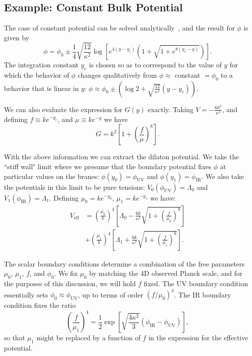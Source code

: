 \documentclass[12pt]{article}
\begin{document}
\subsection{Example:  Constant Bulk Potential}
The case of constant potential can be solved analytically~\cite{Csaki:2000wz}, and the result for $\phi$ is given by
\begin{equation}
\phi = \phi_0 \pm \frac{1}{4}\sqrt{\frac{12}{\kappa^2}} \log \left[ e^{4 (y - y_c)} \left( 1+ \sqrt{ 1 + e^{8 (y_c - y)} } \right) \right].
\end{equation}
The integration constant $y_c$ is chosen so as to correspond to the value of $y$ for which the behavior of $\phi$ changes qualitatively from $\phi \approx $ constant $= \phi_0$ to a behavior that is linear in $y$:  $\phi \approx \phi_0 \pm \left( \log 2+ \sqrt{\frac{12}{\kappa^2}} (y-y_c) \right)$.  

We can also evaluate the expression for $G(y)$ exactly.  Taking $V = -\frac{6 k^2}{\kappa^2}$, and defining $f \equiv k e^{- y_c}$, and $\mu \equiv k e^{-y}$ we have
\begin{equation}
G = k^2 \left[ 1 + \left( \frac{f}{\mu} \right)^8  \right].
\end{equation}

With the above information we can extract the dilaton potential.  We take the ``stiff wall" limit where we presume that the boundary potential fixes $\phi$ at particular values on the branes:  $\phi(y_0) = \phi_\text{UV}$ and $\phi(y_1) = \phi_\text{IR}$.  We also take the potentials in this limit to be pure tensions:  $V_0 (\phi_\text{UV}) = \Lambda_0$ and $V_1 (\phi_\text{IR}) = \Lambda_1$.  Defining $\mu_0 = k e^{-y_0}$, $\mu_1 = k e^{-y_1}$ we have:
\begin{align}
 V_\text{eff} &= \left(\frac{\mu_0}{k}\right)^4 \left[ \Lambda_0  - \frac{6k}{\kappa^2} \sqrt{1+ \left( \frac{f}{\mu_0}\right)^8} \right] \nonumber \\
 &+ \left(\frac{\mu_1}{k}\right)^4 \left[ \Lambda_1+ \frac{6k}{\kappa^2} \sqrt{1+ \left( \frac{f}{\mu_1}\right)^8} \right].
\end{align}

The scalar boundary conditions determine a combination of the free parameters $\mu_0$, $\mu_1$, $f$, and $\phi_0$.  We fix $\mu_0$ by matching the 4D observed Planck scale, and for the purposes of this discussion, we will hold $f$ fixed.  The UV boundary condition essentially sets $\phi_0 \approx \phi_\text{UV}$, up to terms of order $(f/\mu_0)^4$.  The IR boundary condition fixes the ratio 
\begin{equation}
\left( \frac{f}{\mu_1} \right)^4 = \frac{1}{2} \exp \left[ \sqrt{\frac{4 \kappa^2}{3}} \left( \phi_\text{IR} - \phi_\text{UV} \right) \right],
\end{equation}
so that $\mu_1$ might be replaced by a function of $f$ in the expression for the effective potential.
\end{document}
